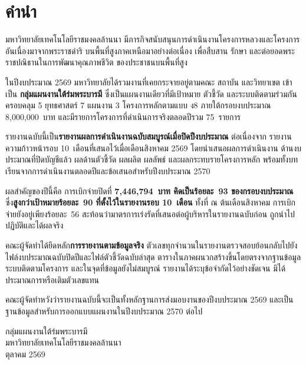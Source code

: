\chapter*{คำนำ}

มหาวิทยาลัยเทคโนโลยีราชมงคลล้านนา มีภารกิจสนับสนุนการดำเนินงานโครงการหลวงและโครงการอันเนื่องมาจากพระราชดำริ
บนพื้นที่สูงภาคเหนือมาอย่างต่อเนื่อง เพื่อสืบสาน รักษา และต่อยอดพระราชปณิธานในการพัฒนาคุณภาพชีวิต
ของประชาชนบนพื้นที่สูง

ในปีงบประมาณ 2569 มหาวิทยาลัยได้รวมงานที่เคยกระจายอยู่ตามคณะ สถาบัน และวิทยาเขต เข้าเป็น
\textbf{กลุ่มแผนงานใต้ร่มพระบารมี} ซึ่งเป็นแผนงานเดียวที่มีเป้าหมาย ตัวชี้วัด และระบบติดตามร่วมกัน
ครอบคลุม 5 ยุทธศาสตร์ 7 แผนงาน 3 โครงการหลักตามแบบ ง8 ภายใต้กรอบงบประมาณ 8,000,000~บาท
และมีรายการโครงการที่ดำเนินการจริงตลอดปีรวม 75~รายการ

รายงานฉบับนี้เป็น\textbf{รายงานผลการดำเนินงานฉบับสมบูรณ์เมื่อปิดปีงบประมาณ} ต่อเนื่องจาก
รายงานความก้าวหน้ารอบ 10~เดือนที่เสนอไว้เมื่อเดือนสิงหาคม 2569 โดยนำเสนอผลการดำเนินงาน
ด้านงบประมาณที่ปิดบัญชีแล้ว ผลด้านตัวชี้วัด ผลผลิต ผลลัพธ์ และผลกระทบรายโครงการหลัก
พร้อมทั้งบทเรียนจากการดำเนินงานตลอดปีและข้อเสนอสำหรับปีงบประมาณ 2570

ผลสำคัญของปีนี้คือ การเบิกจ่ายปิดที่ \textbf{7,446,794~บาท คิดเป็นร้อยละ~93 ของกรอบงบประมาณ}
ซึ่ง\textbf{สูงกว่าเป้าหมายร้อยละ~90 ที่ตั้งไว้ในรายงานรอบ 10~เดือน} ทั้งที่ ณ ต้นเดือนสิงหาคม
การเบิกจ่ายยังอยู่เพียงร้อยละ~56 สะท้อนว่ามาตรการเร่งรัดที่เสนอต่อผู้บริหารในรายงานฉบับก่อน
ถูกนำไปปฏิบัติและได้ผลจริง

คณะผู้จัดทำได้ยึดหลัก\textbf{การรายงานตามข้อมูลจริง} ตัวเลขทุกจำนวนในรายงานตรวจสอบย้อนกลับไปยัง
ไฟล์งบประมาณฉบับปิดปีและไฟล์ตัวชี้วัดฉบับล่าสุด ตารางในภาคผนวกสร้างขึ้นโดยตรงจากฐานข้อมูล
ระบบติดตามโครงการ และในจุดที่ข้อมูลยังไม่สมบูรณ์ รายงานได้ระบุข้อจำกัดไว้อย่างชัดเจน
มิได้ประมาณการหรือเติมตัวเลขแทน

คณะผู้จัดทำหวังว่ารายงานฉบับนี้จะเป็นทั้งหลักฐานการส่งมอบงานของปีงบประมาณ 2569
และเป็นฐานข้อมูลสำหรับการออกแบบแผนงานในปีงบประมาณ 2570 ต่อไป

\vspace{20pt}
\begin{flushright}
\begin{minipage}{0.44\textwidth}
\centering
กลุ่มแผนงานใต้ร่มพระบารมี\\
มหาวิทยาลัยเทคโนโลยีราชมงคลล้านนา\\
ตุลาคม 2569
\end{minipage}
\end{flushright}
